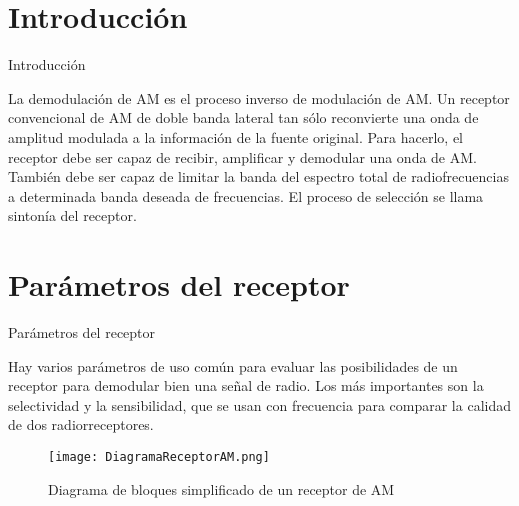\hypertarget{introducciuxf3n}{%
\section{Introducción}\label{introducciuxf3n}}

\begin{frame}{Introducción}

La demodulación de AM es el proceso inverso de modulación de AM. Un
receptor convencional de AM de doble banda lateral tan sólo reconvierte
una onda de amplitud modulada a la información de la fuente original.
Para hacerlo, el receptor debe ser capaz de recibir, amplificar y
demodular una onda de AM. También debe ser capaz de limitar la banda del
espectro total de radiofrecuencias a determinada banda deseada de
frecuencias. El proceso de selección se llama sintonía del receptor.

\end{frame}

\hypertarget{paruxe1metros-del-receptor}{%
\section{Parámetros del receptor}\label{paruxe1metros-del-receptor}}

\begin{frame}{Parámetros del receptor}

Hay varios parámetros de uso común para evaluar las posibilidades de un
receptor para demodular bien una señal de radio. Los más importantes son
la selectividad y la sensibilidad, que se usan con frecuencia para
comparar la calidad de dos radiorreceptores.

\begin{figure}
\centering
\texttt{[image: DiagramaReceptorAM.png]}
\caption{Diagrama de bloques simplificado de un receptor de AM}
\end{figure}

\end{frame}

